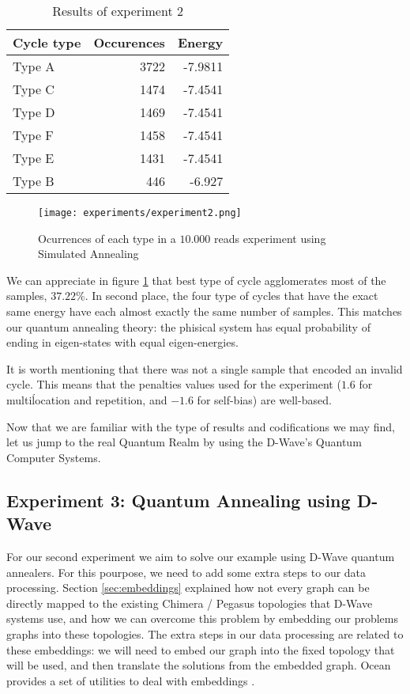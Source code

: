 \begin{table}[H]
	\centering
	\begin{tabular}{lrr}
		\textbf{Cycle type} & \textbf{Occurences} & \textbf{Energy} \\
		\hline
		Type A	& 3722	& -7.9811	\\
		Type C	& 1474	& -7.4541	\\
		Type D	& 1469	& -7.4541	\\
		Type F	& 1458	& -7.4541	\\
		Type E	& 1431	& -7.4541	\\
		Type B	& 446	& -6.927                             
	\end{tabular}
	\caption{Results of experiment 2}
	\label{tab:exp2}
\end{table}

\begin{figure}[H]
	\texttt{[image: experiments/experiment2.png]}
	\centering
	\caption{Ocurrences of each type in a $10.000$ reads experiment using Simulated Annealing}
	\label{fig:exp2-occ}
\end{figure}

We can appreciate in figure \ref{fig:exp2-occ} that best type of cycle agglomerates most of the samples, $37.22\%$. In second place, the four type of cycles that have the exact same energy have each almost exactly the same number of samples. This matches our quantum annealing theory: the phisical system has equal probability of ending in eigen-states with equal eigen-energies.

It is worth mentioning that there was not a single sample that encoded an invalid cycle. This means that the penalties values used for the experiment ($1.6$ for multiĺocation and repetition, and $-1.6$ for self-bias) are well-based.

Now that we are familiar with the type of results and codifications we may find, let us jump to the real Quantum Realm by using the D-Wave's Quantum Computer Systems.


\subsection{Experiment 3: Quantum Annealing using D-Wave}


For our second experiment we aim to solve our example using D-Wave quantum annealers. For this pourpose, we need to add some extra steps to our data processing. Section \ref{sec:embeddings} explained how not every graph can be directly mapped to the existing Chimera / Pegasus topologies that D-Wave systems use, and how we can overcome this problem by embedding our problems graphs into these topologies. The extra steps in our data processing are related to these embeddings: we will need to embed our graph into the fixed topology that will be used, and then translate the solutions from the embedded graph. Ocean provides a set of utilities to deal with embeddings \cite{DWave-OceanDoc-Embedding}.

